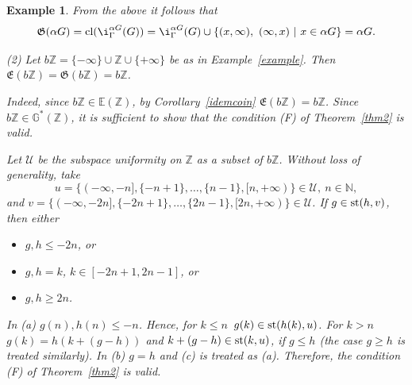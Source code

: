 \documentclass{amsart}
\newtheorem{ex}[thm]{Example}
\newcommand{\cl}{\mbox{{\rm cl}}}
\newcommand{\st}{\mbox{{\rm st}}}
\begin{document}
\begin{ex}
{From the above it follows that 
$$\mathfrak{G}(\alpha G)=\cl (\i^{\alpha G}_{\Gamma} (G))=\i^{\alpha G}_{\Gamma} (G)\cup\{(x, \infty),\ (\infty, x)\ |\ x\in\alpha G\}=\alpha G.$$ 

(2) Let $b\mathbb Z=\{-\infty\}\cup\mathbb Z\cup\{+\infty\}$ be as in Example~\ref{example}. Then $\mathfrak{E}(b\mathbb Z)=\mathfrak{G}(b\mathbb Z)=b\mathbb Z$. 

Indeed, since $b\mathbb Z\in\mathbb E(\mathbb Z)$,  by Corollary~\ref{idemcoin} $\mathfrak{E}(b\mathbb Z)=b\mathbb Z$. Since $b\mathbb Z\in\mathbb G^*(\mathbb Z)$, it is sufficient to show that the condition (F) of Theorem~\ref{thm2} is valid. 

Let $\mathcal U$ be the subspace uniformity on $\mathbb Z$ as a subset of $b\mathbb Z$. Without loss of generality, take 
$$u=\{(-\infty, -n], \{-n+1\}, \ldots, \{n-1\}, [n, +\infty)\}\in\mathcal U,\ n\in\mathbb N,$$
and $v=\{(-\infty, -2n], \{-2n+1\}, \ldots, \{2n-1\}, [2n, +\infty)\}\in\mathcal U$. If $g\in\st (h, v)$, then either 
\begin{itemize}
\item[(a)] $g, h\leq -2n$, or 
\item[(b)] $g, h=k$, $k\in [-2n+1, 2n-1]$, or 
\item[(c)] $g, h\geq 2n$. 
\end{itemize}
In (a) $g(n), h(n)\leq -n$. Hence, for $k\leq n$\ $g(k)\in\st (h(k), u)$. For $k>n$\ $g(k)=h(k+(g-h))$ and $k+(g-h)\in\st (k, u)$, if $g\leq h$ (the case $g\geq h$ is treated similarly). In (b) $g=h$ and (c) is treated as (a). Therefore, the condition (F) of Theorem~\ref{thm2} is valid.}
\end{ex}

\end{document}
